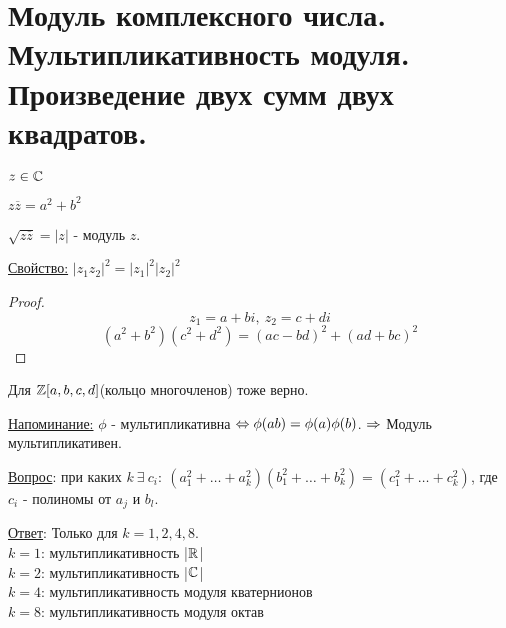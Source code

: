 \section{Модуль комплексного числа. Мультипликативность модуля. Произведение двух
сумм двух квадратов.}

$z \in \mathbb{C}$

$z\overline{z} = a^2 + b^2$ 

\begin{Def}
	$\sqrt{z\overline{z}} = |z|$ - модуль $z$.
\end{Def}

\underline{Свойство:} $|z_1z_2|^2 = |z_1|^2|z_2|^2$
\begin{proof}
	$$z_1 = a + bi,~z_2 = c + di$$
	$$(a^2 + b^2)(c^2 + d^2) = (ac - bd)^2 + (ad + bc)^2$$
\end{proof}
\begin{Rem}
	Для $\mathbb{Z}[a, b, c, d]$(кольцо многочленов) тоже верно.
\end{Rem}

\underline{Напоминание:} $\phi$ - мультипликативна $\Leftrightarrow \phi(ab) = \phi(a)\phi(b)$. $\Rightarrow$ Модуль мультипликативен.

\underline{Вопрос}: при каких $k~\exists~c_i:~(a_1^2 + \dots + a_k^2)(b_1^2 + \dots + b_k^2) = (c_1^2 + \dots + c_k^2)$, где $c_i$ - полиномы от $a_j$ и $b_l$.

\underline{Ответ}: Только для $k = 1, 2, 4, 8$. \\
\hspace*{1cm}$k = 1$: мультипликативность |$\mathbb{R}$|  \\  
\hspace*{1cm}$k = 2$: мультипликативность |$\mathbb{C}$|    \\
\hspace*{1cm}$k = 4$: мультипликативность модуля кватернионов  \\
\hspace*{1cm}$k = 8$: мультипликативность модуля октав


